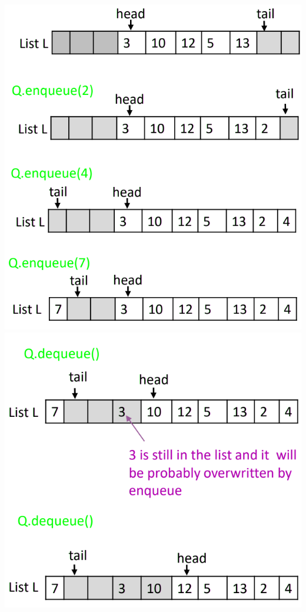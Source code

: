 \documentclass[12pt,oneside]{book}
\begin{document}
\begin{minipage}{0.4\linewidth}
	\includegraphics[width=\linewidth]{../pic/python/23}\\
	\includegraphics[width=\linewidth]{../pic/python/24}
\end{minipage}
\end{document}
